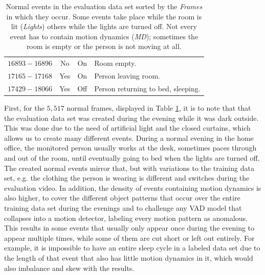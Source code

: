 \begin{table}
\begin{tabular}{ | l | c | c | p{9.5cm} |}
	$16893 - 16896$ & No  & On & Room empty. \\
	$17165 - 17168$ & Yes & On & Person leaving room. \\
	$17429 - 18066$ & Yes & Off  & Person returning to bed, sleeping. \\
	\bottomrule
	\end{tabular}
	\caption[Normal events in the evaluation data set.]{Normal events in the evaluation data set sorted by the \textit{Frames} in which they occur. Some events take place while the room is lit (\textit{Lights}) others while the lights are turned off. Not every event has to contain motion dynamics (\textit{MD}); sometimes the room is empty or the person is not moving at all.}
	\label{tab:dataset_normal}
\end{table}

First, for the $5,517$ normal frames, displayed in Table \ref{tab:dataset_normal}, it is to note that that the evaluation data set was created during the evening while it was dark outside. This was done due to the need of artificial light and the closed curtains, which allows us to create many different events. During a normal evening in the home office, the monitored person usually works at the desk, sometimes paces through and out of the room, until eventually going to bed when the lights are turned off. The created normal events mirror that, but with variations to the training data set, e.g. the clothing the person is wearing is different and switches during the evaluation video. In addition, the density of events containing motion dynamics is also higher, to cover the different object patterns that occur over the entire training data set during the evenings and to challenge any VAD model that collapses into a motion detector, labeling every motion pattern as anomalous. This results in some events that usually only appear once during the evening to appear multiple times, while some of them are cut short or left out entirely. For example, it is impossible to have an entire sleep cycle in a labeled data set due to the length of that event that also has little motion dynamics in it, which would also imbalance and skew with the results.

